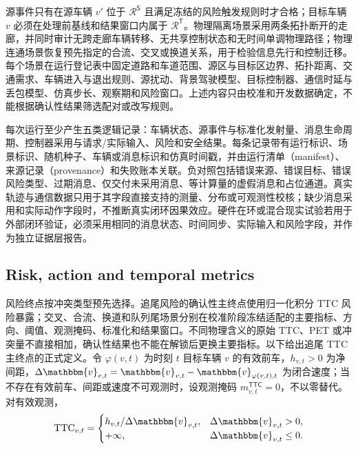 \documentclass[10pt,a4paper,twocolumn]{article}
\begin{document}
源事件只有在源车辆 $v'$ 位于 $\mathcal R^{\mathsf S}$ 且满足冻结的风险触发规则时才合格；目标车辆 $v$ 必须在处理前基线和结果窗口内属于 $\mathcal R^{\mathsf T}$。物理隔离场景采用两条拓扑断开的走廊，并同时审计无跨走廊车辆转移、无共享控制状态和无时间单调物理路径；物理连通场景恢复预先指定的合流、交叉或换道关系，用于检验信息先行和控制迁移。每个场景在运行登记表中固定道路和车道范围、源区与目标区边界、拓扑距离、交通需求、车辆进入与退出规则、源扰动、背景驾驶模型、目标控制器、通信时延与丢包模型、仿真步长、观察期和风险窗口。上述内容只由校准和开发数据确定，不能根据确认性结果筛选配对或改写规则。

每次运行至少产生五类逻辑记录：车辆状态、源事件与标准化发射量、消息生命周期、控制器采用与请求/实际输入、风险和安全结果。每条记录带有运行标识、场景标识、随机种子、车辆或消息标识和仿真时间戳，并由运行清单（manifest）、来源记录（provenance）和失败账本关联。负对照包括错误来源、错误目标、错误风险类型、过期消息、仅交付未采用消息、等计算量的虚假消息和占位通道。真实轨迹与通信数据只用于其字段直接支持的测量、分布或可观测性校核\cite{ngsim2016dataset,coifman2017ngsim,barmpounakis2020pneuma,pneuma2024dataset,spmd2014dataset,zhan2019interaction}；缺少消息采用和实际动作字段时，不推断真实闭环因果效应。硬件在环或混合现实试验若用于外部闭环验证，必须采用相同的消息状态、时间同步、实际输入和风险字段，并作为独立证据层报告。

\subsection*{Risk, action and temporal metrics}
风险终点按冲突类型预先选择。追尾风险的确认性主终点使用归一化积分 TTC 风险暴露；交叉、合流、换道和队列尾场景分别在校准阶段冻结适配的主要指标、方向、阈值、观测掩码、标准化和结果窗口。不同物理含义的原始 TTC、PET 或冲突量不直接相加，确认性结果也不能在解锁后更换主要指标。以下给出追尾 TTC 主终点的正式定义。令 $\varphi(v,t)$ 为时刻 $t$ 目标车辆 $v$ 的有效前车，$h_{v,t}>0$ 为净间距，$\Delta \mathbbm{v}_{v,t}=\mathbbm{v}_{v,t}-\mathbbm{v}_{\varphi(v,t),t}$ 为闭合速度；当不存在有效前车、间距或速度不可观测时，设观测掩码 $m_{v,t}^{\mathsf{TTC}}=0$，不以零替代。对有效观测，
\begin{equation*}
\operatorname{TTC}_{v,t}=
\begin{cases}
h_{v,t}/\Delta \mathbbm{v}_{v,t},&\Delta \mathbbm{v}_{v,t}>0,\\
+\infty,&\Delta \mathbbm{v}_{v,t}\leq 0.
\end{cases}
\end{equation*}
\end{document}
